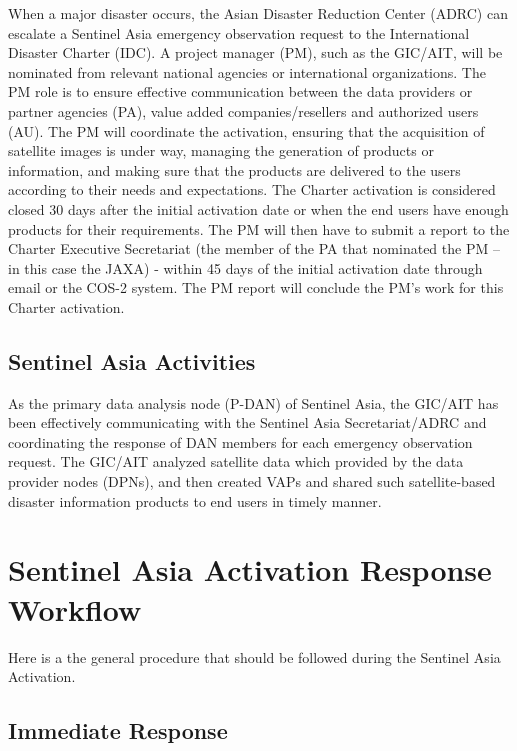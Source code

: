 \documentclass[]{book}
\begin{document}
When a major disaster occurs, the Asian Disaster Reduction Center (ADRC)
can escalate a Sentinel Asia emergency observation request to the
International Disaster Charter (IDC). A project manager (PM), such as
the GIC/AIT, will be nominated from relevant national agencies or
international organizations. The PM role is to ensure effective
communication between the data providers or partner agencies (PA), value
added companies/resellers and authorized users (AU). The PM will
coordinate the activation, ensuring that the acquisition of satellite
images is under way, managing the generation of products or information,
and making sure that the products are delivered to the users according
to their needs and expectations. The Charter activation is considered
closed 30 days after the initial activation date or when the end users
have enough products for their requirements. The PM will then have to
submit a report to the Charter Executive Secretariat (the member of the
PA that nominated the PM -- in this case the JAXA) - within 45 days of
the initial activation date through email or the COS-2 system. The PM
report will conclude the PM's work for this Charter activation.

\section{Sentinel Asia Activities}\label{sentinel-asia-activities}

As the primary data analysis node (P-DAN) of Sentinel Asia, the GIC/AIT
has been effectively communicating with the Sentinel Asia
Secretariat/ADRC and coordinating the response of DAN members for each
emergency observation request. The GIC/AIT analyzed satellite data which
provided by the data provider nodes (DPNs), and then created VAPs and
shared such satellite-based disaster information products to end users
in timely manner.

\chapter{Sentinel Asia Activation Response
Workflow}\label{sentinel-asia-activation-response-workflow}

Here is a the general procedure that should be followed during the
Sentinel Asia Activation.

\section{Immediate Response}\label{immediate-response}
\end{document}
